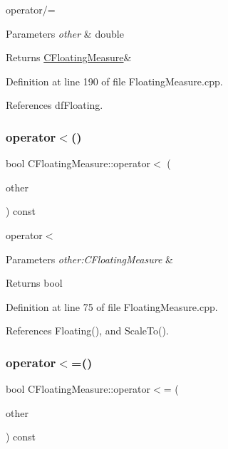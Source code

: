 operator/= 


\begin{DoxyParams}{Parameters}
{\em other} & double \\
\hline
\end{DoxyParams}
\begin{DoxyReturn}{Returns}
\hyperlink{classCFloatingMeasure}{C\+Floating\+Measure}\& 
\end{DoxyReturn}


Definition at line 190 of file Floating\+Measure.\+cpp.



References df\+Floating.

\mbox{\label{classCFloatingMeasure_a35d506664a6a72856d56cbf18ea9d2a4}} 
\subsubsection{\texorpdfstring{operator$<$()}{operator<()}}
{\footnotesize\ttfamily bool C\+Floating\+Measure\+::operator$<$ (\begin{DoxyParamCaption}\item[{const \hyperlink{classCFloatingMeasure}{C\+Floating\+Measure} \&}]{other }\end{DoxyParamCaption}) const}



operator$<$ 


\begin{DoxyParams}{Parameters}
{\em other\+:\+C\+Floating\+Measure} & \\
\hline
\end{DoxyParams}
\begin{DoxyReturn}{Returns}
bool 
\end{DoxyReturn}


Definition at line 75 of file Floating\+Measure.\+cpp.



References Floating(), and Scale\+To().

\mbox{\label{classCFloatingMeasure_ad8b94201f5df969de576f89a249c947e}} 
\subsubsection{\texorpdfstring{operator$<$=()}{operator<=()}}
{\footnotesize\ttfamily bool C\+Floating\+Measure\+::operator$<$= (\begin{DoxyParamCaption}\item[{const \hyperlink{classCFloatingMeasure}{C\+Floating\+Measure} \&}]{other }\end{DoxyParamCaption}) const}



